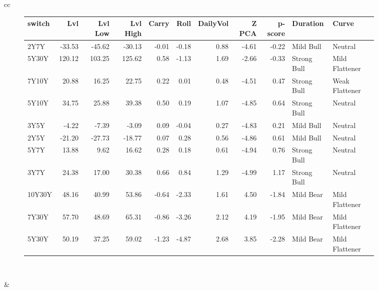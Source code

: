 \documentclass[a4paper,oneside]{report}
\begin{document}
\begin{figure}[htbp]
\begin{tabular}[c]{cc}
\begin{subfigure}[c]{0.5\textwidth}
\begin{adjustbox}{max width=\textwidth}
\begin{tabular}{lrrrrrrrrll}
\hline
 switch &     Lvl &  Lvl Low &  Lvl High &  Carry &  Roll &  DailyVol &  Z PCA &  p-score &     Duration &           Curve \\
\hline
   2Y7Y &  -33.53 &   -45.62 &    -30.13 &  -0.01 & -0.18 &      0.88 &  -4.61 &    -0.22 &    Mild Bull &         Neutral \\
  5Y30Y &  120.12 &   103.25 &    125.62 &   0.58 & -1.13 &      1.69 &  -2.66 &    -0.33 &  Strong Bull &  Mild Flattener \\
  7Y10Y &   20.88 &    16.25 &     22.75 &   0.22 &  0.01 &      0.48 &  -4.51 &     0.47 &  Strong Bull &  Weak Flattener \\
  5Y10Y &   34.75 &    25.88 &     39.38 &   0.50 &  0.19 &      1.07 &  -4.85 &     0.64 &  Strong Bull &         Neutral \\
   3Y5Y &   -4.22 &    -7.39 &     -3.09 &   0.09 & -0.04 &      0.27 &  -4.83 &     0.21 &    Mild Bull &         Neutral \\
   2Y5Y &  -21.20 &   -27.73 &    -18.77 &   0.07 &  0.28 &      0.56 &  -4.86 &     0.61 &    Mild Bull &         Neutral \\
   5Y7Y &   13.88 &     9.62 &     16.62 &   0.28 &  0.18 &      0.61 &  -4.94 &     0.76 &  Strong Bull &         Neutral \\
   3Y7Y &   24.38 &    17.00 &     30.38 &   0.66 &  0.84 &      1.29 &  -4.99 &     1.17 &  Strong Bull &         Neutral \\
 10Y30Y &   48.16 &    40.99 &     53.86 &  -0.64 & -2.33 &      1.61 &   4.50 &    -1.84 &    Mild Bear &  Mild Flattener \\
  7Y30Y &   57.70 &    48.69 &     65.31 &  -0.86 & -3.26 &      2.12 &   4.19 &    -1.95 &    Mild Bear &  Mild Flattener \\
  5Y30Y &   50.19 &    37.25 &     59.02 &  -1.23 & -4.87 &      2.68 &   3.85 &    -2.28 &    Mild Bear &  Mild Flattener \\
\hline
\end{tabular}
\end{adjustbox}
 \end{subfigure}\\
 
 
\begin{subfigure}[c]{0.5\textwidth}
 
 \end{subfigure}&
 

\end{tabular}
\end{figure}
\end{document}

